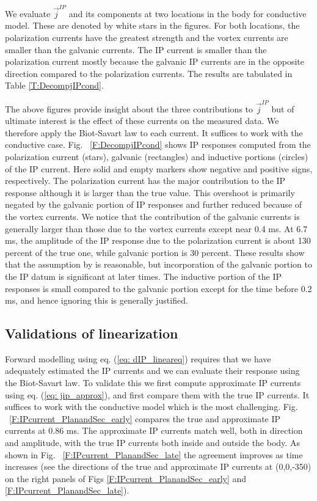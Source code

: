 \documentclass[extra,mreferee]{gji}
\renewcommand {\j}  { {\vec j} }
\begin{document}
We evaluate $\j^{IP} $ and its components at two locations in the body for conductive model. These are denoted by white stars in the figures.  For both locations, the polarization currents have the greatest strength and the vortex currents are smaller than the galvanic currents. The IP current is smaller than the polarization current mostly because the galvanic IP currents are in the opposite direction compared to the polarization currents. The results are tabulated in Table \ref{T:DecompjIPcond}.

The above figures provide insight about the three contributions to $\j^{IP}$ but of ultimate interest is the effect of these currents on the measured data.
We therefore apply the Biot-Savart law to each current. It suffices to work with the conductive case.
Fig. ~\ref{F:DecompjIPcond} shows IP responses computed from the polarization current (stars), galvanic (rectangles) and inductive portions (circles) of the IP current. Here solid and empty markers show negative and positive signs, respectively.
The polarization current has the major contribution to the IP response although it is larger than the true value. This overshoot is primarily negated by the galvanic portion of IP responses and further reduced because of the vortex currents. We notice that the contribution of the galvanic currents is generally larger than those due to the vortex currents except near 0.4 ms.
At 6.7 ms, the amplitude of the  IP response due to the polarization current is about 130 percent of the true one, while galvanic portion is 30 percent.
These results show that the assumption by \cite{Smith1988a} is reasonable, but incorporation of the galvanic portion to the IP datum is significant at later times.
The inductive portion of the IP responses  is small  compared to the galvanic portion except for the time before 0.2 ms, and hence ignoring this is generally justified.

\subsection{Validations of linearization}
Forward modelling using eq. (\ref{eq: dIP_lineareq}) requires that we have adequately estimated the IP currents and we can evaluate their response using the Biot-Savart law. To validate this we first compute approximate IP currents using eq. (\ref{eq: jip_approx}), and first compare them with the true IP currents. It suffices to work with the conductive model which is the most challenging. Fig. ~\ref{F:IPcurrent_PlanandSec_early} compares the true and approximate IP currents at 0.86 ms. The approximate IP currents match well, both in direction and amplitude, with the true IP currents both inside and outside the body. As shown in Fig. ~\ref{F:IPcurrent_PlanandSec_late} the agreement improves as time increases (see the directions of the true and approximate IP currents at (0,0,-350) on the right panels of Figs \ref{F:IPcurrent_PlanandSec_early} and \ref{F:IPcurrent_PlanandSec_late}).
\end{document}
